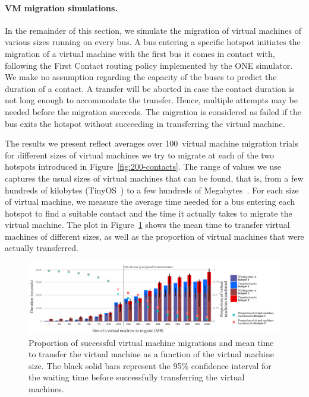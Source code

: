 \paragraph{VM migration simulations.}
In the remainder of this section, we simulate the migration of virtual machines of various sizes running on every bus. A bus entering a specific hotspot initiates the migration of a virtual machine with the first bus it comes in contact with, following the First Contact routing policy implemented by the ONE simulator. We make no assumption regarding the capacity of the buses to predict the duration of a contact. A transfer will be aborted in case the contact duration is not long enough to accommodate the transfer. Hence, multiple attempts may be needed before the migration succeeds. The migration is considered as failed if the bus exits the hotspot without succeeding in transferring the virtual machine.

The results we present reflect averages over 100~virtual machine migration trials for different sizes of virtual machines we try to migrate at each of the two hotspots introduced in Figure~\ref{fig:200-contacts}. The range of values we use captures the usual sizes of virtual machines that can be found, that is, from a few hundreds of kilobytes (\eg TinyOS~\cite{levis2005tinyos}) to a few hundreds of Megabytes~\cite{clark2005live}. For each size of virtual machine, we measure the average time needed for a bus entering each hotspot to find a suitable contact and the time it actually takes to migrate the virtual machine. The plot in Figure~\ref{fig:graph} shows the mean time to transfer virtual machines of different sizes, as well as the proportion of virtual machines that were actually transferred. 

\begin{figure}[t]
  \centering
  \includegraphics[width=0.98\linewidth]{figures/duration-ratio-migrations.pdf}
  \caption{Proportion of successful virtual machine migrations and mean time to transfer the virtual machine as a function of the virtual machine size. The black solid bars represent the 95\% confidence interval for the waiting time before successfully transferring the virtual machines.}
  \label{fig:graph}
\end{figure} 

